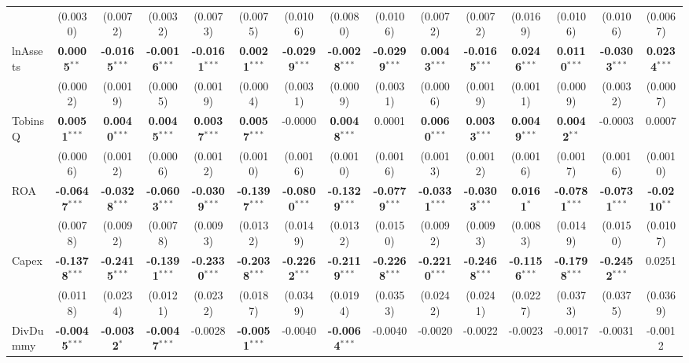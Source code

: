 \begin{landscape}
\begin{table}[H]
\begin{tabular}{lcccccccccccccc}
 & (0.0030) & (0.0072) & (0.0032) & (0.0073) & (0.0075) & (0.0106) & (0.0080) & (0.0106) & (0.0072) & (0.0072) & (0.0169) & (0.0106) & (0.0106) & (0.0067) \\
lnAssets & \textbf{0.0005}$^{**}$ & \textbf{-0.0165}$^{***}$ & \textbf{-0.0016}$^{***}$ & \textbf{-0.0161}$^{***}$ & \textbf{0.0021}$^{***}$ & \textbf{-0.0299}$^{***}$ & \textbf{-0.0028}$^{***}$ & \textbf{-0.0299}$^{***}$ & \textbf{0.0043}$^{***}$ & \textbf{-0.0165}$^{***}$ & \textbf{0.0246}$^{***}$ & \textbf{0.0110}$^{***}$ & \textbf{-0.0303}$^{***}$ & \textbf{0.0234}$^{***}$ \\
 & (0.0002) & (0.0019) & (0.0005) & (0.0019) & (0.0004) & (0.0031) & (0.0009) & (0.0031) & (0.0006) & (0.0019) & (0.0011) & (0.0009) & (0.0032) & (0.0007) \\
TobinsQ & \textbf{0.0051}$^{***}$ & \textbf{0.0040}$^{***}$ & \textbf{0.0045}$^{***}$ & \textbf{0.0037}$^{***}$ & \textbf{0.0057}$^{***}$ & -0.0000 & \textbf{0.0048}$^{***}$ & 0.0001 & \textbf{0.0060}$^{***}$ & \textbf{0.0033}$^{***}$ & \textbf{0.0049}$^{***}$ & \textbf{0.0042}$^{**}$ & -0.0003 & 0.0007 \\
 & (0.0006) & (0.0012) & (0.0006) & (0.0012) & (0.0010) & (0.0016) & (0.0010) & (0.0016) & (0.0013) & (0.0012) & (0.0016) & (0.0017) & (0.0016) & (0.0010) \\
ROA & \textbf{-0.0647}$^{***}$ & \textbf{-0.0328}$^{***}$ & \textbf{-0.0603}$^{***}$ & \textbf{-0.0309}$^{***}$ & \textbf{-0.1397}$^{***}$ & \textbf{-0.0800}$^{***}$ & \textbf{-0.1329}$^{***}$ & \textbf{-0.0779}$^{***}$ & \textbf{-0.0331}$^{***}$ & \textbf{-0.0303}$^{***}$ & \textbf{0.0161}$^{*}$ & \textbf{-0.0781}$^{***}$ & \textbf{-0.0731}$^{***}$ & \textbf{-0.0210}$^{**}$ \\
 & (0.0078) & (0.0092) & (0.0078) & (0.0093) & (0.0132) & (0.0149) & (0.0132) & (0.0150) & (0.0092) & (0.0093) & (0.0083) & (0.0149) & (0.0150) & (0.0107) \\
Capex & \textbf{-0.1378}$^{***}$ & \textbf{-0.2415}$^{***}$ & \textbf{-0.1391}$^{***}$ & \textbf{-0.2330}$^{***}$ & \textbf{-0.2038}$^{***}$ & \textbf{-0.2262}$^{***}$ & \textbf{-0.2119}$^{***}$ & \textbf{-0.2268}$^{***}$ & \textbf{-0.2210}$^{***}$ & \textbf{-0.2468}$^{***}$ & \textbf{-0.1156}$^{***}$ & \textbf{-0.1798}$^{***}$ & \textbf{-0.2452}$^{***}$ & 0.0251 \\
 & (0.0118) & (0.0234) & (0.0121) & (0.0232) & (0.0187) & (0.0349) & (0.0194) & (0.0353) & (0.0242) & (0.0241) & (0.0227) & (0.0373) & (0.0375) & (0.0369) \\
DivDummy & \textbf{-0.0045}$^{***}$ & \textbf{-0.0032}$^{*}$ & \textbf{-0.0047}$^{***}$ & -0.0028 & \textbf{-0.0051}$^{***}$ & -0.0040 & \textbf{-0.0064}$^{***}$ & -0.0040 & -0.0020 & -0.0022 & -0.0023 & -0.0017 & -0.0031 & -0.0012 \\

\end{tabular}
\end{table}
\end{landscape}
